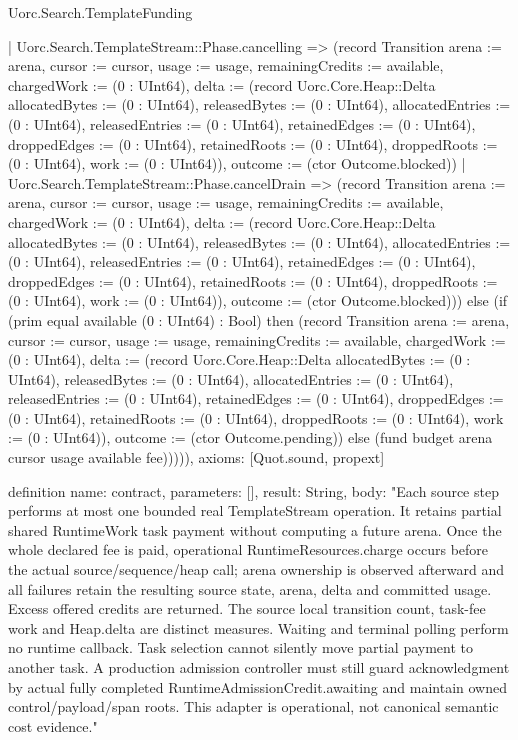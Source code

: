 \begin{lexlean}{Uorc.Search.TemplateFunding}
\begin{semanticmodule}
{      | Uorc.Search.TemplateStream::Phase.cancelling => (record Transition {arena := arena, cursor := cursor, usage := usage, remainingCredits := available, chargedWork := (0 : UInt64), delta := (record Uorc.Core.Heap::Delta {allocatedBytes := (0 : UInt64), releasedBytes := (0 : UInt64), allocatedEntries := (0 : UInt64), releasedEntries := (0 : UInt64), retainedEdges := (0 : UInt64), droppedEdges := (0 : UInt64), retainedRoots := (0 : UInt64), droppedRoots := (0 : UInt64), work := (0 : UInt64)}), outcome := (ctor Outcome.blocked)})
      | Uorc.Search.TemplateStream::Phase.cancelDrain => (record Transition {arena := arena, cursor := cursor, usage := usage, remainingCredits := available, chargedWork := (0 : UInt64), delta := (record Uorc.Core.Heap::Delta {allocatedBytes := (0 : UInt64), releasedBytes := (0 : UInt64), allocatedEntries := (0 : UInt64), releasedEntries := (0 : UInt64), retainedEdges := (0 : UInt64), droppedEdges := (0 : UInt64), retainedRoots := (0 : UInt64), droppedRoots := (0 : UInt64), work := (0 : UInt64)}), outcome := (ctor Outcome.blocked)})) else (if (prim equal available (0 : UInt64) : Bool) then (record Transition {arena := arena, cursor := cursor, usage := usage, remainingCredits := available, chargedWork := (0 : UInt64), delta := (record Uorc.Core.Heap::Delta {allocatedBytes := (0 : UInt64), releasedBytes := (0 : UInt64), allocatedEntries := (0 : UInt64), releasedEntries := (0 : UInt64), retainedEdges := (0 : UInt64), droppedEdges := (0 : UInt64), retainedRoots := (0 : UInt64), droppedRoots := (0 : UInt64), work := (0 : UInt64)}), outcome := (ctor Outcome.pending)}) else (fund budget arena cursor usage available fee))))),
  axioms: [Quot.sound, propext]
}

definition{
  name: contract,
  parameters: [],
  result: String,
  body: "Each source step performs at most one bounded real TemplateStream operation. It retains partial shared RuntimeWork task payment without computing a future arena. Once the whole declared fee is paid, operational RuntimeResources.charge occurs before the actual source/sequence/heap call; arena ownership is observed afterward and all failures retain the resulting source state, arena, delta and committed usage. Excess offered credits are returned. The source local transition count, task-fee work and Heap.delta are distinct measures. Waiting and terminal polling perform no runtime callback. Task selection cannot silently move partial payment to another task. A production admission controller must still guard acknowledgment by actual fully completed RuntimeAdmissionCredit.awaiting and maintain owned control/payload/span roots. This adapter is operational, not canonical semantic cost evidence."
}
\end{semanticmodule}
\end{lexlean}
